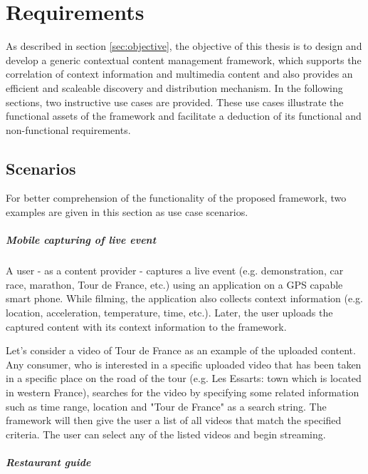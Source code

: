 \chapter{Requirements\label{cha:chapter3}}
As described in section \ref{sec:objective}, the objective of this thesis is to design and develop a generic contextual content management framework, which supports the correlation of context information and multimedia content and also provides an efficient and scaleable discovery and distribution mechanism. In the following sections, two instructive use cases are provided. These use cases illustrate the functional assets of the framework and facilitate a deduction of its functional and non-functional requirements.
 
 
\section{Scenarios\label{sec:req_sce}}

For better comprehension of the functionality of the proposed framework, two examples are given in this section as use case scenarios.

\paragraph{Mobile capturing of live event}

A user - as a content provider - captures a live event (e.g. demonstration, car race, marathon, Tour de France, etc.) using an application on a \ac{GPS} capable smart phone. While filming, the application also collects context information (e.g. location, acceleration, temperature, time, etc.). Later, the user uploads the captured content with its context information to the framework.

Let's consider a video of Tour de France as an example of the uploaded content. Any consumer, who is interested in a specific uploaded video that has been taken in a specific place on the road of the tour (e.g. Les Essarts: town which is located in western France), searches for the video by specifying some related information such as time range, location and "Tour de France" as a search string. The framework will then give the user a list of all videos that match the specified criteria. The user can select any of the listed videos and begin streaming.

\paragraph{Restaurant guide}

